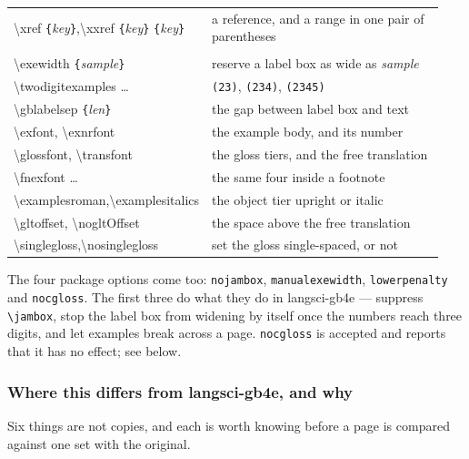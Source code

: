 \documentclass[11pt,a4paper]{article}
\newcommand{\cs}[1]{\texttt{\textbackslash #1}}
\newcommand{\pkg}[2][]{\textsf{#2}}
\newcommand{\opt}[1]{\texttt{#1}}
\newcommand{\meta}[1]{\textrm{\itshape\textlangle#1\textrangle}}
\newcommand{\marg}[1]{\penalty300 \texttt{\{}\meta{#1}\texttt{\}}}
\begin{document}
\begin{center}
\begin{longtable}{@{}>{\ttfamily\raggedright}p{0.34\linewidth} p{0.60\linewidth}@{}}
\textbackslash xref\marg{key},\linebreak \textbackslash xxref\marg{key}\marg{key} & a reference, and a range in one pair of parentheses\\
\addlinespace
\multicolumn{2}{@{}l}{\normalfont\itshape lengths and fonts}\\
\textbackslash exewidth\marg{sample} & reserve a label box as wide as \meta{sample}\\
\textbackslash twodigitexamples \dots & \texttt{(23)}, \texttt{(234)}, \texttt{(2345)}\\
\textbackslash gblabelsep\marg{len} & the gap between label box and text\\
\textbackslash exfont, \textbackslash exnrfont & the example body, and its number\\
\textbackslash glossfont, \textbackslash transfont & the gloss tiers, and the free translation\\
\textbackslash fnexfont \dots & the same four inside a footnote\\
\textbackslash examplesroman,\linebreak \textbackslash examplesitalics & the object tier upright or italic\\
\textbackslash gltoffset, \textbackslash nogltOffset & the space above the free translation\\
\textbackslash singlegloss,\linebreak \textbackslash nosinglegloss & set the gloss single-spaced, or not\\
\bottomrule
\end{longtable}
\end{center}

\noindent The four package options come too: \opt{nojambox},
\opt{manualexewidth}, \opt{lowerpenalty} and \opt{nocgloss}. The first three
do what they do in \pkg{langsci-gb4e} --- suppress \cs{jambox}, stop the label box from
widening by itself once the numbers reach three digits, and let examples
break across a page. \opt{nocgloss} is accepted and reports that it has no
effect; see below.

\subsubsection*{Where this differs from \pkg{langsci-gb4e}, and why}

Six things are not copies, and each is worth knowing before a page is
compared against one set with the original.
\end{document}
